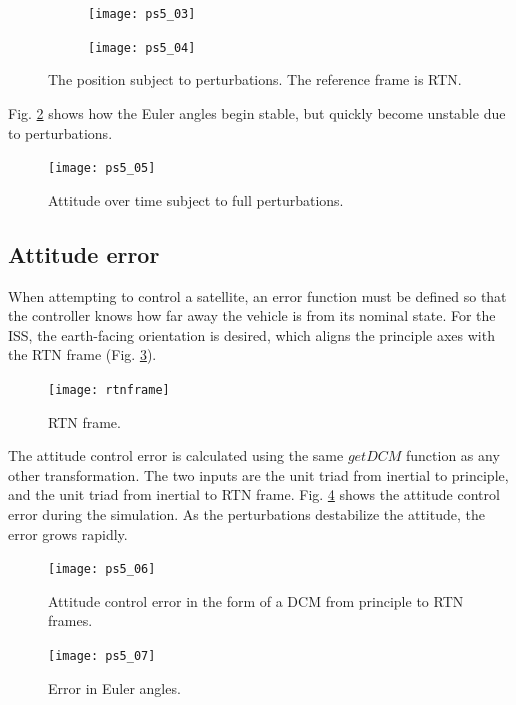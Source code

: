 \documentclass[12pt, letterpaper]{article}
\begin{document}
\begin{figure}[H]
	\centering
	\begin{subfigure}[b]{0.49\textwidth}
		\texttt{[image: ps5\_03]}
	\end{subfigure}
	\begin{subfigure}[b]{0.49\textwidth}
		\texttt{[image: ps5\_04]}
	\end{subfigure}
	\caption{The position subject to perturbations. The reference frame is RTN.}
	\label{5:pos}
\end{figure}

Fig. \ref{5:05} shows how the Euler angles begin stable, but quickly become unstable due to perturbations.

\begin{figure}[H]
	\centering
	\texttt{[image: ps5\_05]}
	\caption{Attitude over time subject to full perturbations.}
	\label{5:05}
\end{figure}

\subsection{Attitude error}

When attempting to control a satellite, an error function must be defined so that the controller knows how far away the vehicle is from its nominal state. For the ISS, the earth-facing orientation is desired, which aligns the principle axes with the RTN frame (Fig. \ref{5:rtn}).


\begin{figure}[H]
	\centering
	\texttt{[image: rtnframe]}
	\caption{RTN frame.}
	\label{5:rtn}
\end{figure}

The attitude control error is calculated using the same \href{https://github.com/buckleytoby/aa279c_github/blob/master/src/getDCM.m}{$getDCM$} function as any other transformation. The two inputs are the unit triad from inertial to principle, and the unit triad from inertial to RTN frame. Fig. \ref{5:06} shows the attitude control error during the simulation. As the perturbations destabilize the attitude, the error grows rapidly.

\begin{figure}[H]
	\centering
	\texttt{[image: ps5\_06]}
	\caption{Attitude control error in the form of a DCM from principle to RTN frames.}
	\label{5:06}
\end{figure}


\begin{figure}[H]
	\centering
	\texttt{[image: ps5\_07]}
	\caption{Error in Euler angles.}
	\label{5:07}
\end{figure}
\end{document}
